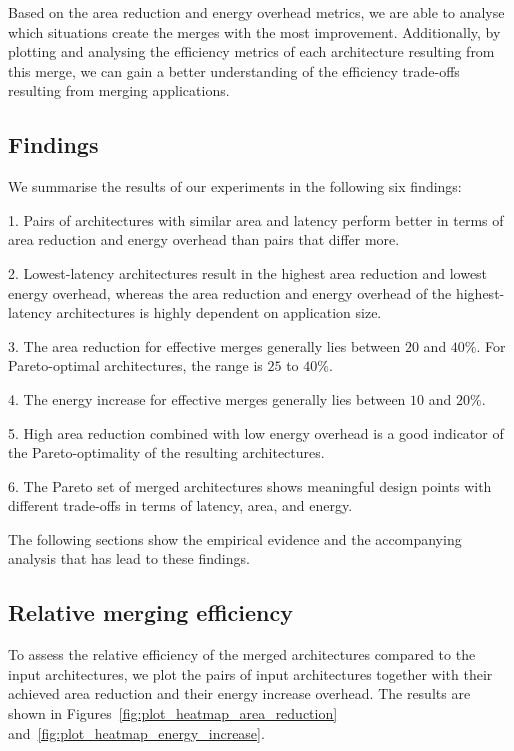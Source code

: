 Based on the area reduction and energy overhead metrics, we are able to analyse which situations create the merges with the most improvement. Additionally, by plotting and analysing the efficiency metrics of each architecture resulting from this merge, we can gain a better understanding of the efficiency trade-offs resulting from merging applications.

\subsection{Findings}
We summarise the results of our experiments in the following six findings:


1. Pairs of architectures with similar area and latency perform better in terms of area reduction and energy overhead than pairs that differ more.

2. Lowest-latency architectures result in the highest area reduction and lowest energy overhead, whereas the area reduction and energy overhead of the highest-latency architectures is highly dependent on application size.

3. The area reduction for effective merges generally lies between $20$ and $40\%$. For Pareto-optimal architectures, the range is $25$ to $40\%$.

4. The energy increase for effective merges generally lies between $10$ and $20\%$.

5. High area reduction combined with low energy overhead is a good indicator of the Pareto-optimality of the resulting architectures.

6. The Pareto set of merged architectures shows meaningful design points with different trade-offs in terms of latency, area, and energy.

\noindent
The following sections show the empirical evidence and the accompanying analysis that has lead to these findings.

\subsection{Relative merging efficiency}
To assess the relative efficiency of the merged architectures compared to the input architectures, we plot the pairs of input architectures together with their achieved area reduction and their energy increase overhead. The results are shown in Figures~\ref{fig:plot_heatmap_area_reduction} and~\ref{fig:plot_heatmap_energy_increase}.

